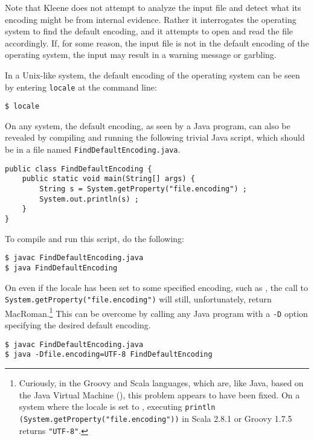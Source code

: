 Note that Kleene does not attempt to analyze the input file and detect what its encoding
might be from internal evidence.  Rather it interrogates the operating system to
find the default encoding, and it attempts to open and read the file accordingly.  If, for some reason,
the input file is not in the default encoding of the operating system, the input
may result in a warning message or garbling.

In a Unix-like system, the default encoding of the operating system can be seen by
entering \texttt{locale} at the command line:

\begin{Verbatim}
$ locale
\end{Verbatim}

\noindent
On any system, the default encoding, as seen by a Java program, can also be revealed by compiling
and running the following trivial Java script, which should be in a file named
\texttt{FindDefaultEncoding.java}.

\begin{Verbatim}
public class FindDefaultEncoding {
    public static void main(String[] args) {
        String s = System.getProperty("file.encoding") ;
        System.out.println(s) ;
    }
}
\end{Verbatim}

\noindent
To compile and run this script, do the following:

\begin{Verbatim}
$ javac FindDefaultEncoding.java
$ java FindDefaultEncoding
\end{Verbatim}

On  even if the locale has been set to some specified
encoding, such as , the call to
\verb!System.getProperty("file.encoding")! will still, unfortunately,
return MacRoman.\footnote{Curiously, in the Groovy and Scala
languages, which are, like Java, based on the Java Virtual Machine
(), this problem appears to have been fixed.  On a
system where the locale is set to , executing
\texttt{println (System.getProperty("file.encoding"))} in Scala
2.8.1 or Groovy 1.7.5 returns \verb!"UTF-8"!.}  This can be overcome by calling any Java program with a
\verb!-D! option specifying the desired default
encoding.

\begin{Verbatim}
$ javac FindDefaultEncoding.java
$ java -Dfile.encoding=UTF-8 FindDefaultEncoding
\end{Verbatim}

